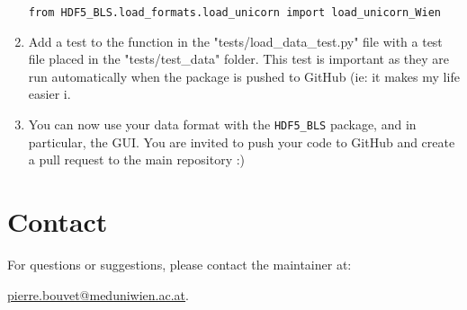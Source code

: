 \documentclass[a4paper,12pt]{article}
\begin{document}
\begin{enumerate}
\begin{lstlisting}
from HDF5_BLS.load_formats.load_unicorn import load_unicorn_Wien
\end{lstlisting}
            \item Add a test to the function in the "tests/load\_data\_test.py" file with a test file placed in the "tests/test\_data" folder. This test is important as they are run automatically when the package is pushed to GitHub (ie: it makes my life easier ^^). 
            \item You can now use your data format with the \texttt{HDF5\_BLS} package, and in particular, the GUI. You are invited to push your code to GitHub and create a pull request to the main repository :)
        \end{enumerate}

\section*{Contact}
For questions or suggestions, please contact the maintainer at:

\begin{center}
    \href{mailto:pierre.bouvet@meduniwien.ac.at}{pierre.bouvet@meduniwien.ac.at}.
\end{center}
\end{document}
